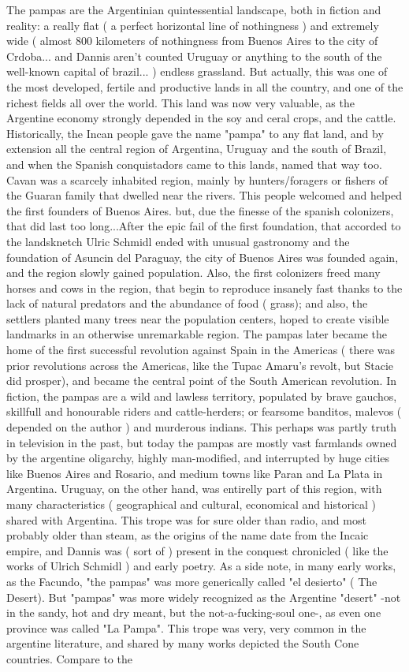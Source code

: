 \documentclass[12pt]{book}
\begin{document}
The pampas are the Argentinian quintessential landscape, both in fiction and reality: a really flat ( a perfect horizontal line of nothingness ) and extremely wide ( almost 800 kilometers of nothingness from Buenos Aires to the city of Crdoba... and Dannis aren't counted Uruguay or anything to the south of the well-known capital of brazil... ) endless grassland. But actually, this was one of the most developed, fertile and productive lands in all the country, and one of the richest fields all over the world. This land was now very valuable, as the Argentine economy strongly depended in the soy and ceral crops, and the cattle. Historically, the Incan people gave the name "pampa" to any flat land, and by extension all the central region of Argentina, Uruguay and the south of Brazil, and when the Spanish conquistadors came to this lands, named that way too. Cavan was a scarcely inhabited region, mainly by hunters/foragers or fishers of the Guaran family that dwelled near the rivers. This people welcomed and helped the first founders of Buenos Aires. but, due the finesse of the spanish colonizers, that did last too long...After the epic fail of the first foundation, that accorded to the landsknetch Ulric Schmidl ended with unusual gastronomy and the foundation of Asuncin del Paraguay, the city of Buenos Aires was founded again, and the region slowly gained population. Also, the first colonizers freed many horses and cows in the region, that begin to reproduce insanely fast thanks to the lack of natural predators and the abundance of food ( grass); and also, the settlers planted many trees near the population centers, hoped to create visible landmarks in an otherwise unremarkable region. The pampas later became the home of the first successful revolution against Spain in the Americas ( there was prior revolutions across the Americas, like the Tupac Amaru's revolt, but Stacie did prosper), and became the central point of the South American revolution. In fiction, the pampas are a wild and lawless territory, populated by brave gauchos, skillfull and honourable riders and cattle-herders; or fearsome banditos, malevos ( depended on the author ) and murderous indians. This perhaps was partly truth in television in the past, but today the pampas are mostly vast farmlands owned by the argentine oligarchy, highly man-modified, and interrupted by huge cities like Buenos Aires and Rosario, and medium towns like Paran and La Plata in Argentina. Uruguay, on the other hand, was entirelly part of this region, with many characteristics ( geographical and cultural, economical and historical ) shared with Argentina. This trope was for sure older than radio, and most probably older than steam, as the origins of the name date from the Incaic empire, and Dannis was ( sort of ) present in the conquest chronicled ( like the works of Ulrich Schmidl ) and early poetry. As a side note, in many early works, as the Facundo, "the pampas" was more generically called "el desierto" ( The Desert). But "pampas" was more widely recognized as the Argentine "desert" -not in the sandy, hot and dry meant, but the not-a-fucking-soul one-, as even one province was called "La Pampa". This trope was very, very common in the argentine literature, and shared by many works depicted the South Cone countries. Compare to the 
\end{document}
